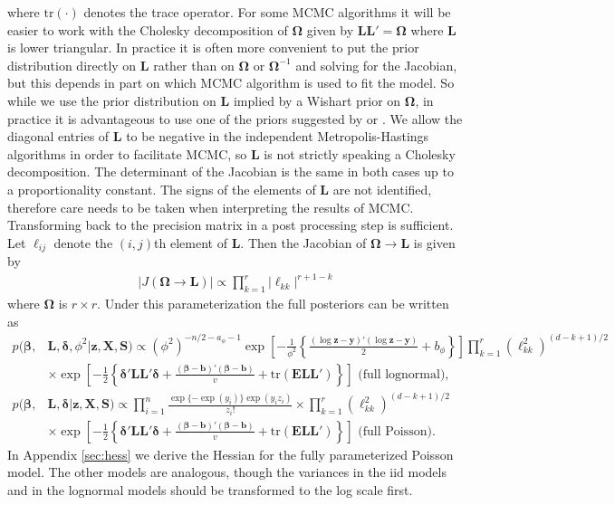 \documentclass[12pt]{article}
\begin{document}
where $\mathrm{tr}(\cdot)$ denotes the trace operator. For some MCMC algorithms it will be easier to work with the Cholesky decomposition of $\bm{\Omega}$ given by $\bm{L}\bm{L}'=\bm{\Omega}$ where $\bm{L}$ is lower triangular. In practice it is often more convenient to put the prior distribution directly on $\bm{L}$ rather than on $\bm{\Omega}$ or $\bm{\Omega}^{-1}$ and solving for the Jacobian, but this depends in part on which MCMC algorithm is used to fit the model. So while we use the prior distribution on $\bm{L}$ implied by a Wishart prior on $\bm{\Omega}$, in practice it is advantageous to use one of the priors suggested by \citet{chen2003random} or \citet{fruhwirth2008bayesian}. We allow the diagonal entries of $\bm{L}$ to be negative in the independent Metropolis-Hastings algorithms in order to facilitate MCMC, so $\bm{L}$ is not strictly speaking a Cholesky decomposition. The determinant of the Jacobian is the same in both cases up to a proportionality constant. The signs of the elements of $\bm{L}$ are not identified, therefore care needs to be taken when interpreting the results of MCMC. Transforming back to the precision matrix in a post processing step is sufficient. Let $\ell_{ij}$ denote the $(i,j)$th element of $\bm{L}$. Then the Jacobian of $\bm{\Omega}\to\bm{L}$ is given by
\begin{align*}
|J(\bm{\Omega}\to\bm{L})| \propto \prod_{k=1}^r |\ell_{kk}|^{r + 1 - k}
\end{align*}
where $\bm{\Omega}$ is $r\times r$. Under this parameterization the full posteriors can be written as
\begin{align}
p(\bm{\beta},& \bm{L}, \bm{\delta}, \phi^2|\bm{z}, \bm{X}, \bm{S}) \propto (\phi^2)^{-n/2 - a_\phi - 1}\exp\left[-\frac{1}{\phi^2}\left\{\frac{(\log\bm{z} - \bm{y})'(\log\bm{z} - \bm{y})}{2} + b_\phi\right\}\right] \prod_{k=1}^r (\ell_{kk}^2)^{(d - k + 1)/2}\nonumber\\
&\times \exp\left[-\frac{1}{2}\left\{\bm{\delta}'\bm{L}\bm{L}'\bm{\delta}+\frac{(\bm{\beta} - \bm{b})'(\bm{\beta} - \bm{b})}{v} + \mathrm{tr}(\bm{E}\bm{L}\bm{L}')\right\}\right]\mbox{\ \ \ \ \ (full lognormal),}\label{eq:fullnormpostchol}\\
p(\bm{\beta},& \bm{L}, \bm{\delta}|\bm{z}, \bm{X}, \bm{S}) \propto \prod_{i=1}^n \frac{\exp\{-\exp(y_i)\}\exp(y_iz_i)}{z_i!} \times \prod_{k=1}^r (\ell_{kk}^2)^{(d - k + 1)/2}  \nonumber\\
&\times \exp\left[-\frac{1}{2}\left\{\bm{\delta}'\bm{L}\bm{L}'\bm{\delta}+\frac{(\bm{\beta} - \bm{b})'(\bm{\beta} - \bm{b})}{v} + \mathrm{tr}(\bm{E}\bm{L}\bm{L}')\right\}\right]\mbox{\ \ \ \ \ (full Poisson).}\label{eq:fullpoispostchol}
\end{align}
In Appendix \ref{sec:hess} we derive the Hessian for the fully parameterized Poisson model. The other models are analogous, though the variances in the iid models and in the lognormal models should be transformed to the log scale first.
\end{document}
